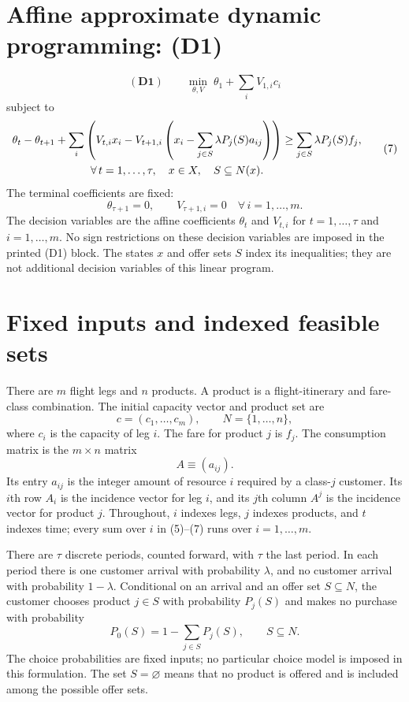 \documentclass{article}
\begin{document}
\section*{Affine approximate dynamic programming: (D1)}

\begin{equation}
(\mathbf{D1})\qquad
\min_{\theta,V}\;\theta_1+\sum_i V_{1,i}c_i
\tag{6}
\end{equation}
subject to
\begin{equation}
\begin{aligned}
&\theta_t-\theta_{t+1}
 +\sum_i\left(V_{t,i}x_i-V_{t+1,i}\left(x_i-\sum_{j\in S}\lambda P_j(S)a_{ij}\right)\right)
 \geq \sum_{j\in S}\lambda P_j(S)f_j,\\
&\hspace{25mm}\forall\,t=1,\ldots,\tau,\quad x\in X,\quad S\subseteq N(x).
\end{aligned}
\tag{7}
\end{equation}
The terminal coefficients are fixed:
\[
\theta_{\tau+1}=0,\qquad V_{\tau+1,i}=0\quad\forall\,i=1,\ldots,m.
\]
The decision variables are the affine coefficients $\theta_t$ and $V_{t,i}$ for $t=1,\ldots,\tau$ and $i=1,\ldots,m$. No sign restrictions on these decision variables are imposed in the printed (D1) block. The states $x$ and offer sets $S$ index its inequalities; they are not additional decision variables of this linear program.

\section*{Fixed inputs and indexed feasible sets}

There are $m$ flight legs and $n$ products. A product is a flight-itinerary and fare-class combination. The initial capacity vector and product set are
\[
c=(c_1,\ldots,c_m),\qquad N=\{1,\ldots,n\},
\]
where $c_i$ is the capacity of leg $i$. The fare for product $j$ is $f_j$. The consumption matrix is the $m\times n$ matrix
\[
A\equiv(a_{ij}).
\]
Its entry $a_{ij}$ is the integer amount of resource $i$ required by a class-$j$ customer. Its $i$th row $A_i$ is the incidence vector for leg $i$, and its $j$th column $A^j$ is the incidence vector for product $j$. Throughout, $i$ indexes legs, $j$ indexes products, and $t$ indexes time; every sum over $i$ in (5)--(7) runs over $i=1,\ldots,m$.

There are $\tau$ discrete periods, counted forward, with $\tau$ the last period. In each period there is one customer arrival with probability $\lambda$, and no customer arrival with probability $1-\lambda$. Conditional on an arrival and an offer set $S\subseteq N$, the customer chooses product $j\in S$ with probability $P_j(S)$ and makes no purchase with probability
\[
P_0(S)=1-\sum_{j\in S}P_j(S),\qquad S\subseteq N.
\]
The choice probabilities are fixed inputs; no particular choice model is imposed in this formulation. The set $S=\varnothing$ means that no product is offered and is included among the possible offer sets.
\end{document}
